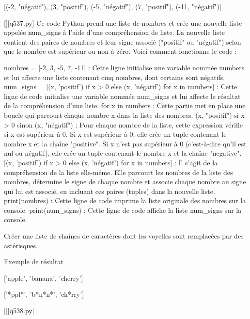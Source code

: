 [(-2, "négatif"), (3, "positif"), (-5, "négatif"), (7, "positif"), (-11, "négatif")]
        \par
        \begin{solution}
            \renewcommand{\nomfichier}{q537.py}
            \pythonfile{\chemincode \nomfichier}[][\nomfichier]
            Ce code Python prend une liste de nombres et crée une nouvelle liste appelée num_signs à l'aide d'une compréhension de liste. La nouvelle liste contient des paires de nombres et leur signe associé ("positif" ou "négatif") selon que le nombre est supérieur ou non à zéro. Voici comment fonctionne le code :

    nombres = [-2, 3, -5, 7, -11] : Cette ligne initialise une variable nommée numbers et lui affecte une liste contenant cinq nombres, dont certains sont négatifs.
    num_signs = [(x, 'positif') if x > 0 else (x, 'négatif') for x in numbers] : Cette ligne de code initialise une variable nommée num_signs et lui affecte le résultat de la compréhension d'une liste.
        for x in numbers : Cette partie met en place une boucle qui parcourt chaque nombre x dans la liste des nombres.
        (x, "positif") si x > 0 sinon (x, "négatif") : Pour chaque nombre de la liste, cette expression vérifie si x est supérieur à 0. Si x est supérieur à 0, elle crée un tuple contenant le nombre x et la chaîne "positive". Si x n'est pas supérieur à 0 (c'est-à-dire qu'il est nul ou négatif), elle crée un tuple contenant le nombre x et la chaîne "negative".
        [(x, 'positif') if x > 0 else (x, 'négatif') for x in numbers] : Il s'agit de la compréhension de la liste elle-même. Elle parcourt les nombres de la liste des nombres, détermine le signe de chaque nombre et associe chaque nombre au signe qui lui est associé, en incluant ces paires (tuples) dans la nouvelle liste.
    print(nombres) : Cette ligne de code imprime la liste originale des nombres sur la console.
    print(num_signs) : Cette ligne de code affiche la liste num_signs sur la console.
        \end{solution}
        

        \question
        Créer une liste de chaînes de caractères dont les voyelles sont remplacées par des astérisques.

Exemple de résultat

['apple', 'banana', 'cherry']

['*ppl*', 'b*n*n*', 'ch*rry']
        \par
        \begin{solution}
            \renewcommand{\nomfichier}{q538.py}
            \pythonfile{\chemincode \nomfichier}[][\nomfichier]
            
        \end{solution}
        

